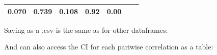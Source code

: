 \documentclass[]{article}
\newenvironment{Shaded}{\begin{snugshade}}{\end{snugshade}}
\newcommand{\KeywordTok}[1]{\textcolor[rgb]{0.13,0.29,0.53}{\textbf{#1}}}
\newcommand{\DataTypeTok}[1]{\textcolor[rgb]{0.13,0.29,0.53}{#1}}
\newcommand{\StringTok}[1]{\textcolor[rgb]{0.31,0.60,0.02}{#1}}
\newcommand{\OperatorTok}[1]{\textcolor[rgb]{0.81,0.36,0.00}{\textbf{#1}}}
\newcommand{\NormalTok}[1]{#1}
\theoremstyle{definition}
\theoremstyle{definition}
\theoremstyle{definition}
\theoremstyle{remark}
\begin{document}
\begin{longtable}[]{@{}ccccccc@{}}
\begin{minipage}[t]{0.11\columnwidth}
0.070\strut
\end{minipage} & \begin{minipage}[t]{0.09\columnwidth}\centering\strut
0.739\strut
\end{minipage} & \begin{minipage}[t]{0.09\columnwidth}\centering\strut
0.108\strut
\end{minipage} & \begin{minipage}[t]{0.09\columnwidth}\centering\strut
0.92\strut
\end{minipage} & \begin{minipage}[t]{0.09\columnwidth}\centering\strut
0.00\strut
\end{minipage}\tabularnewline
\bottomrule
\end{longtable}

Saving as a .csv is the same as for other dataframes:

\begin{Shaded}
\end{Shaded}

And can also access the CI for each pariwise correlation as a table:

\begin{Shaded}
\end{Shaded}
\end{document}
